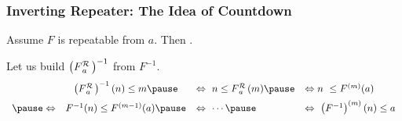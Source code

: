 \begin{frame}
\frametitle{Inverting Repeater: The Idea of Countdown}

Assume $F$ is repeatable from $a$.
Then .

\smallskip

Let us build $\left(\rf{F}{a}\ \right)^{-1}$ from $F^{-1}$.
\pause
	\begin{equation*}
	\displayindent0pt
	\displaywidth\textwidth
	\begin{array}{ccll}
	& \left(\rf{F}{a}\ \right)^{-1}(n)\le m \pause & \iff \ n \le \rf{F}{a}\ (m) \pause & \iff n \ \le F^{(m)}(a) \\[5pt]
  \pause \iff & F^{-1}(n)\le F^{(m-1)}(a) \pause & \iff \ \cdots \pause &
	\iff \ \left(F^{-1}\right)^{(m)}(n) \le a 
	\end{array}
	\end{equation*}

\pause
{}

\end{frame}




